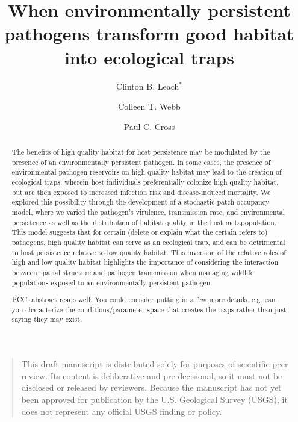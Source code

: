 \documentclass{article}
\begin{document}
\title{When environmentally persistent pathogens transform good habitat into ecological traps}


\author[1]{Clinton B. Leach$^*$}
\author[1]{Colleen T. Webb}
\author[2]{Paul C. Cross}


\maketitle


\begin{quote}
This draft manuscript is distributed solely for purposes of scientific peer review.  Its content is deliberative and pre decisional, so it must not be disclosed or released by reviewers.  Because the manuscript has not yet been approved for publication by the U.S. Geological Survey (USGS), it does not represent any official USGS finding or policy.
\end{quote}


\begin{abstract} 
The benefits of high quality habitat for host persistence may be modulated by the presence of an environmentally persistent pathogen. In some cases, the presence of environmental pathogen reservoirs on high quality habitat may lead to the creation of ecological traps, wherein host individuals preferentially colonize high quality habitat, but are then exposed to increased infection risk and disease-induced mortality.  We explored this possibility through the development of a stochastic patch occupancy model, where we varied the pathogen's virulence, transmission rate, and environmental persistence as well as the distribution of habitat quality in the host metapopulation.  This model suggests that for certain (delete or explain what the certain refers to) pathogens, high quality habitat can serve as an ecological trap, and can be detrimental to host persistence relative to low quality habitat.  This inversion of the relative roles of high and low quality habitat highlights the importance of considering the interaction between spatial structure and pathogen transmission when managing wildlife populations exposed to an environmentally persistent pathogen.

PCC: abstract reads well. You could consider putting in a few more details. e.g. can you characterize the conditions/parameter space that creates the traps rather than just saying they may exist. 

\end{abstract}
\end{document}

